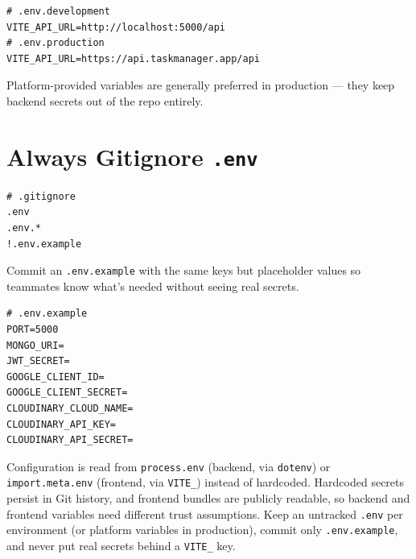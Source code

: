 \begin{lstlisting}
# .env.development
VITE_API_URL=http://localhost:5000/api
# .env.production
VITE_API_URL=https://api.taskmanager.app/api
\end{lstlisting}

\begin{notebox}[NOTE]
Platform-provided variables are generally preferred in production --- they
keep backend secrets out of the repo entirely.
\end{notebox}

\section{Always Gitignore \texttt{.env}}

\begin{lstlisting}
# .gitignore
.env
.env.*
!.env.example
\end{lstlisting}

Commit an \texttt{.env.example} with the same keys but placeholder values
so teammates know what's needed without seeing real secrets.

\begin{lstlisting}
# .env.example
PORT=5000
MONGO_URI=
JWT_SECRET=
GOOGLE_CLIENT_ID=
GOOGLE_CLIENT_SECRET=
CLOUDINARY_CLOUD_NAME=
CLOUDINARY_API_KEY=
CLOUDINARY_API_SECRET=
\end{lstlisting}

\whatwhyhow
{Configuration is read from \texttt{process.env} (backend, via \texttt{dotenv}) or \texttt{import.meta.env} (frontend, via \texttt{VITE\_}) instead of hardcoded.}
{Hardcoded secrets persist in Git history, and frontend bundles are publicly readable, so backend and frontend variables need different trust assumptions.}
{Keep an untracked \texttt{.env} per environment (or platform variables in production), commit only \texttt{.env.example}, and never put real secrets behind a \texttt{VITE\_} key.}
